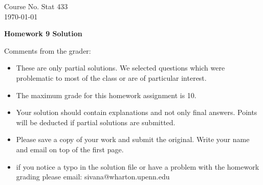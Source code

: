 \documentclass[10pt,a4paper]{article}
\begin{document}
\begin{flushleft}
Course No. Stat 433 \\
\today
\end{flushleft}

\begin{center}
{\Large{\bf  Homework 9 Solution}}
\end{center}

\textcolor[rgb]{0.98,0.00,0.00}{Comments from the grader:}
\begin{itemize}

    \item \textcolor[rgb]{0.98,0.00,0.00}{These are only partial solutions.  We selected
    questions which were problematic to most of the class or are of particular interest.}
    \item \textcolor[rgb]{0.98,0.00,0.00}{The maximum grade for this homework assignment is 10.}
    \item \textcolor[rgb]{0.98,0.00,0.00}{Your solution should contain explanations and not only
    final answers. Points will be deducted if partial solutions
    are submitted.}
    \item \textcolor[rgb]{0.98,0.00,0.00}{Please save a copy of your work and submit the original.
    Write your name and email on top of the first page.}
    \item \textcolor[rgb]{0.98,0.00,0.00}{if you notice a typo in the solution file or have a problem with the homework
    grading please email: sivana@wharton.upenn.edu
}
\end{itemize}
\end{document}
